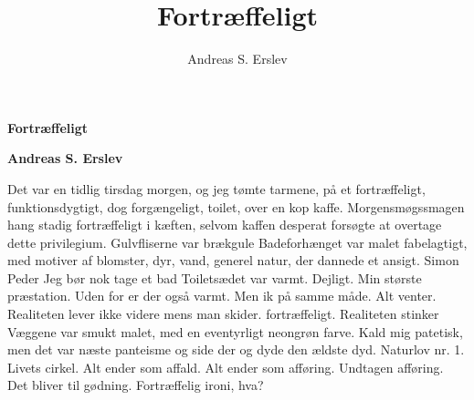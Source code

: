 \documentclass[]{article}
\title{Fortræffeligt}
\author{Andreas S. Erslev}
\begin{document}
	
	\begin{center}
		\Large\textbf{Fortræffeligt}
	\end{center}
	
	\begin{center}
		\large\textbf{Andreas S. Erslev}
	\end{center}
	
	Det var en tidlig tirsdag morgen, og jeg tømte tarmene, på et fortræffeligt, funktionsdygtigt, dog forgængeligt, toilet, over en kop kaffe.
	\newline
	\newline
	Morgensmøgssmagen hang stadig fortræffeligt i kæften, selvom kaffen desperat forsøgte at overtage dette privilegium.
	\newline
	\newline
	Gulvfliserne var brækgule
	\newline
	\newline
	Badeforhænget var malet fabelagtigt, med motiver af blomster, dyr, vand, generel natur, der dannede et ansigt.
	\newline
	\newline
	Simon Peder
	\newline
	\newline
	Jeg bør nok tage et bad
	\newline
	\newline
	Toiletsædet var varmt. Dejligt. Min største præstation. Uden for er der også varmt. Men ik på samme måde. Alt venter. Realiteten lever ikke videre mens man skider. fortræffeligt.
	\newline
	\newline
	Realiteten stinker
	\newline
	\newline
	Væggene var smukt malet, med en eventyrligt neongrøn farve. Kald mig patetisk, men det var næste panteisme og side der og dyde den ældste dyd. Naturlov nr. 1. Livets cirkel. Alt ender som affald. Alt ender som afføring.
	\newline
	\newline
	Undtagen afføring. Det bliver til gødning. Fortræffelig ironi, hva?
	
\end{document}
